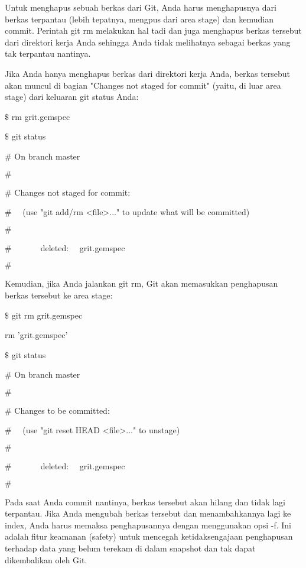  \par
\noindent 
Untuk menghapus sebuah berkas dari Git, Anda harus menghapusnya dari berkas terpantau (lebih tepatnya, mengpus dari area stage) dan kemudian commit. Perintah $  $git rm $  $melakukan hal tadi dan juga menghapus berkas tersebut dari direktori kerja Anda sehingga Anda tidak melihatnya sebagai berkas yang tak terpantau nantinya. \par
\noindent 
Jika Anda hanya menghapus berkas dari direktori kerja Anda, berkas tersebut akan muncul di bagian "Changes not staged for commit" (yaitu, di luar area stage) dari keluaran $  $git status $  $Anda: \par
\noindent 
 $  \$  $ rm grit.gemspec \par
\noindent 
 $  \$  $ git status \par
\noindent 
 $  \#  $ On branch master \par
\noindent 
 $  \#  $ \par
\noindent 
 $  \#  $ Changes not staged for commit: \par
\noindent 
 $  \#  $~~ (use "git add/rm <file>..." to update what will be committed) \par
\noindent 
 $  \#  $ \par
\noindent 
 $  \#  $~~~~~~~deleted:~~  grit.gemspec \par
\noindent 
 $  \#  $ \par
\noindent 
Kemudian, jika Anda jalankan $  $git rm, Git akan memasukkan penghapusan berkas tersebut ke area stage: \par
\noindent 
 $  \$  $ git rm grit.gemspec \par
\noindent 
rm 'grit.gemspec' \par
\noindent 
 $  \$  $ git status \par
\noindent 
 $  \#  $ On branch master \par
\noindent 
 $  \#  $ \par
\noindent 
 $  \#  $ Changes to be committed: \par
\noindent 
 $  \#  $~~ (use "git reset HEAD <file>..." to unstage) \par
\noindent 
 $  \#  $ \par
\noindent 
 $  \#  $~~~~~~~deleted:~~  grit.gemspec \par
\noindent 
 $  \#  $ \par
\noindent 
Pada saat Anda commit nantinya, berkas tersebut akan hilang dan tidak lagi terpantau. Jika Anda mengubah berkas tersebut dan menambahkannya lagi ke index, Anda harus memaksa penghapusannya dengan menggunakan opsi $  $-f. Ini adalah fitur keamanan (safety) untuk mencegah ketidaksengajaan penghapusan terhadap data yang belum terekam di dalam snapshot dan tak dapat dikembalikan oleh Git. \par
